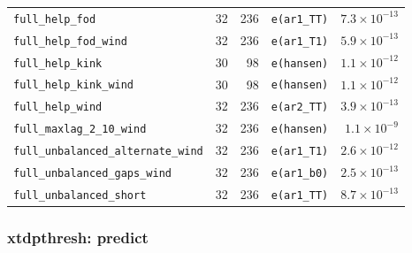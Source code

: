 \begin{longtable}{@{}p{3.6cm}rrp{4.9cm}r@{}}
\texttt{full\_\allowbreak{}help\_\allowbreak{}fod} & 32 & 236 & \texttt{e(ar1\_\allowbreak{}TT)} & $7.3\times10^{-13}$ \\
\texttt{full\_\allowbreak{}help\_\allowbreak{}fod\_\allowbreak{}wind} & 32 & 236 & \texttt{e(ar1\_\allowbreak{}T1)} & $5.9\times10^{-13}$ \\
\texttt{full\_\allowbreak{}help\_\allowbreak{}kink} & 30 & 98 & \texttt{e(hansen)} & $1.1\times10^{-12}$ \\
\texttt{full\_\allowbreak{}help\_\allowbreak{}kink\_\allowbreak{}wind} & 30 & 98 & \texttt{e(hansen)} & $1.1\times10^{-12}$ \\
\texttt{full\_\allowbreak{}help\_\allowbreak{}wind} & 32 & 236 & \texttt{e(ar2\_\allowbreak{}TT)} & $3.9\times10^{-13}$ \\
\texttt{full\_\allowbreak{}maxlag\_\allowbreak{}2\_\allowbreak{}10\_\allowbreak{}wind} & 32 & 236 & \texttt{e(hansen)} & $1.1\times10^{-9}$ \\
\texttt{full\_\allowbreak{}unbalanced\_\allowbreak{}alternate\_\allowbreak{}wind} & 32 & 236 & \texttt{e(ar1\_\allowbreak{}T1)} & $2.6\times10^{-12}$ \\
\texttt{full\_\allowbreak{}unbalanced\_\allowbreak{}gaps\_\allowbreak{}wind} & 32 & 236 & \texttt{e(ar1\_\allowbreak{}b0)} & $2.5\times10^{-13}$ \\
\texttt{full\_\allowbreak{}unbalanced\_\allowbreak{}short} & 32 & 236 & \texttt{e(ar1\_\allowbreak{}TT)} & $8.7\times10^{-13}$ \\
\bottomrule
\end{longtable}

\subsubsection*{xtdpthresh: predict}

